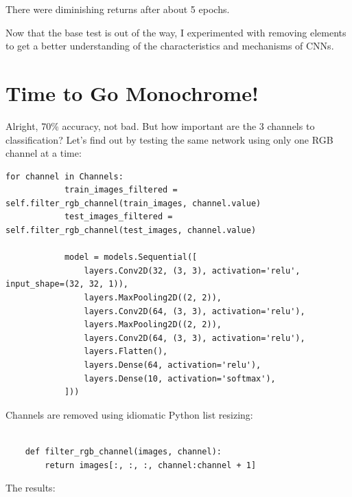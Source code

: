 \documentclass{article}
\begin{document}
    There were diminishing returns after about 5 epochs.

    Now that the base test is out of the way, I experimented with removing elements to get a better understanding of the characteristics and mechanisms of CNNs.


    \section{Time to Go Monochrome!}\label{sec:one-channel}

    Alright, 70\% accuracy, not bad.
    But how important are the 3 channels to classification?
    Let's find out by testing the same network using only one RGB channel at a time:

    \begin{lstlisting}[label={lst:channel_code}]
        for channel in Channels:
            train_images_filtered = self.filter_rgb_channel(train_images, channel.value)
            test_images_filtered = self.filter_rgb_channel(test_images, channel.value)

            model = models.Sequential([
                layers.Conv2D(32, (3, 3), activation='relu', input_shape=(32, 32, 1)),
                layers.MaxPooling2D((2, 2)),
                layers.Conv2D(64, (3, 3), activation='relu'),
                layers.MaxPooling2D((2, 2)),
                layers.Conv2D(64, (3, 3), activation='relu'),
                layers.Flatten(),
                layers.Dense(64, activation='relu'),
                layers.Dense(10, activation='softmax'),
            ]))
    \end{lstlisting}

    Channels are removed using idiomatic Python list resizing:

    \begin{lstlisting}[label={lst:bye-bye-channel}]

    def filter_rgb_channel(images, channel):
        return images[:, :, :, channel:channel + 1]
    \end{lstlisting}

    The results:
\end{document}
